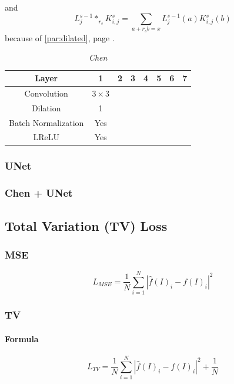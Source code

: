 \documentclass{article}
\begin{document}
            and
            \begin{equation}
                L_j^{s-1}*_{r_s}K^s_{i,j}=\sum_{a+r_sb=x}L_j^{s-1}(a)K_{i,j}^s(b)
            \end{equation}
            because of \ref{par:dilated}, page \pageref{par:dilated}.

            \begin{table}[!ht]
                \center
                \begin{tabular}{|c|c|c|c|c|c|c|c|}
                    \hline
                    Layer & 1 & 2 & 3 & 4 & 5 & 6 & 7\\
                    \hline \hline
                    Convolution & $3\times3$ & & & & & & \\
                    \hline
                    Dilation & 1 & & & & & & \\
                    \hline
                    Batch Normalization & Yes & & & & & & \\
                    \hline
                    LReLU & Yes & & & & & & \\
                    \hline
                \end{tabular}
                \caption{\textit{Chen}}
            \end{table}

        \subsubsection{UNet}
        \subsubsection{Chen + UNet}

    \subsection{Total Variation (TV) Loss}
        \subsubsection{MSE}
        $$L_{MSE}=\frac{1}{N}\sum_{i=1}^N |\hat{f}(I)_i-f(I)_i|^2$$

        \subsubsection{TV}
            \paragraph{Formula}
            $$L_{TV}=\frac{1}{N}\sum_{i=1}^N |\hat{f}(I)_i-f(I)_i|^2+\frac{1}{N}$$
\end{document}
